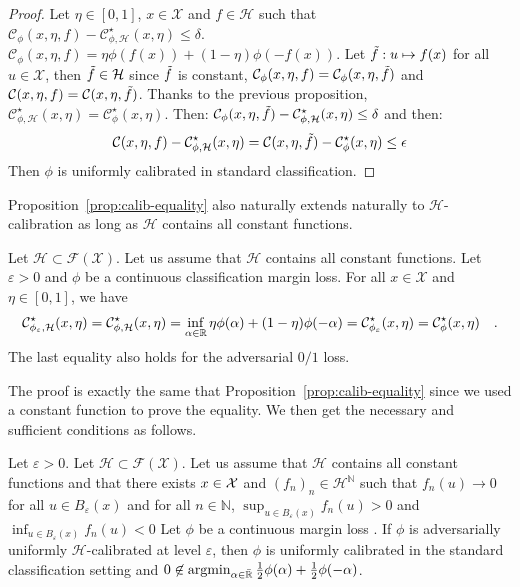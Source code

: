 \begin{proof}
Let $\eta\in[0,1]$, $x\in\mathcal{X}$ and $f\in\mathcal{H}$ such that $ \mathcal{C}_{\phi}(x,\eta,f)- \mathcal{C}^\star_{\phi,\mathcal{H}}(x,\eta)\leq\delta$.  $\mathcal{C}_{\phi}(x,\eta,f) = \eta\phi(f(x))+(1-\eta)\phi(-f(x))$. Let $\Tilde{f}:u\mapsto f(x)$ for all $u\in\mathcal{X}$, then $\Tilde{f}\in\mathcal{H}$ since $\Tilde{f}$ is constant, $\mathcal{C}_{\phi}(x,\eta,f) = \mathcal{C}_{\phi}(x,\eta,\Tilde{f})$ and $\mathcal{C}(x,\eta,f) = \mathcal{C}(x,\eta,\Tilde{f})$. Thanks to the previous proposition, $\mathcal{C}^\star_{\phi,\mathcal{H}}(x,\eta)=\mathcal{C}^\star_{\phi}(x,\eta)$. Then: $ \mathcal{C}_{\phi}(x,\eta,\Tilde{f})-\mathcal{C}^\star_{\phi,\mathcal{H}}(x,\eta)\leq \delta$ and then:
\begin{align*}
    \mathcal{C}(x,\eta,f)-\mathcal{C}^\star_{\phi,\mathcal{H}}(x,\eta) =  \mathcal{C}(x,\eta,\Tilde{f})-\mathcal{C}^\star_{\phi}(x,\eta) \leq \epsilon
\end{align*}
Then $\phi$ is uniformly calibrated in standard classification.
\end{proof}




Proposition~\ref{prop:calib-equality} also naturally extends naturally to $\mathcal{H}$-calibration as long as $\mathcal{H}$ contains all constant functions. 


\begin{prop*}
Let $\mathcal{H}\subset \mathcal{F}(\mathcal{X})$. Let us assume that $\mathcal{H}$ contains all constant functions. Let $\varepsilon>0$ and $\phi$ be a continuous classification margin loss.  For all $x\in\mathcal{X}$ and $\eta\in[0,1]$, we have
\begin{align*}
    \mathcal{C}^\star_{\phi_\varepsilon,\mathcal{H}}(x,\eta)=\mathcal{C}^\star_{\phi,\mathcal{H}}(x,\eta) =\inf_{\alpha\in\mathbb{R}}\eta \phi(\alpha)+(1-\eta)\phi(-\alpha)= \mathcal{C}^\star_{\phi_\varepsilon}(x,\eta)=\mathcal{C}^\star_{\phi}(x,\eta)\quad.
\end{align*}
The last equality also holds for the adversarial $0/1$ loss.
\end{prop*}
The proof is exactly the same that Proposition~\ref{prop:calib-equality} since we used a constant function to prove the equality. We then get the necessary and sufficient conditions as follows.



\begin{prop*} 
Let $\varepsilon>0$. Let $\mathcal{H}\subset \mathcal{F}(\mathcal{X})$. Let us assume that $\mathcal{H}$ contains all constant functions and that there exists $x\in\mathcal{X}$ and $(f_n)_n\in\mathcal{H}^\mathbb{N}$ such that $f_n(u)\to 0$ for all $ u\in B_\varepsilon(x)$ and for all $n\in\mathbb{N}$, $\sup_{u\in B_\varepsilon(x)} f_n(u)>0$ and  $\inf_{u\in B_\varepsilon(x)} f_n(u)<0$ 
Let $\phi$  be a continuous margin loss .  If $\phi$ is adversarially uniformly $\mathcal{H}$-calibrated at level $\varepsilon$, then $\phi$ is uniformly calibrated in the standard classification setting and $0\not\in \operatorname*{argmin}_{\alpha\in\bar{\mathbb{R}}}
\frac12\phi(\alpha)+\frac12\phi(-\alpha)$. 

\end{prop*}


